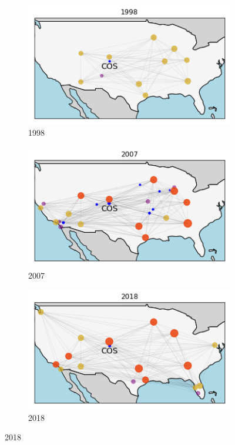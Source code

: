 \begin{figure}[H]
  \centering
  \caption{Network of Colorado Springs (COS) and its direct neighbors}
    \begin{subfigure}[t]{0.31\textwidth}
        \centering
        \includegraphics[width=\linewidth]{Exam/Figures/map_COS_98}
        \caption{1998}
    \end{subfigure}
    \hfill
    \begin{subfigure}[t]{0.31\textwidth}
        \centering
        \includegraphics[width=\linewidth]{Exam/Figures/map_COS_07} 
        \caption{2007}
    \end{subfigure}
    \hfill
    \begin{subfigure}[t]{0.31\textwidth}
        \centering
        \includegraphics[width=\linewidth]{Exam/Figures/map_COS_18} 
        \caption{2018}
    \end{subfigure}
  \label{fig:map_COS}
\end{figure}
